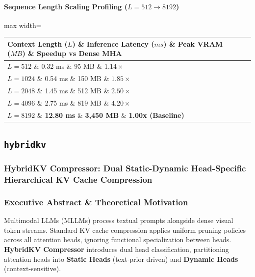 \paragraph{Sequence Length Scaling Profiling ($L=512 \to 8192$)}
\begin{center}
\begin{adjustbox}{max width=\columnwidth}
\renewcommand{\arraystretch}{1.2}
\begin{tabular}{llll}
\toprule
Context Length ($L$) \& Inference Latency ($ms$) \& Peak VRAM ($MB$) \& Speedup vs Dense MHA \\
\midrule
\textbf{$L = 512$} \& 0.32 ms \& 95 MB \& $1.14\times$ \\
\textbf{$L = 1024$} \& 0.54 ms \& 150 MB \& $1.85\times$ \\
\textbf{$L = 2048$} \& 1.45 ms \& 512 MB \& $2.50\times$ \\
\textbf{$L = 4096$} \& 2.75 ms \& 819 MB \& $4.20\times$ \\
\textbf{$L = 8192$} \& \textbf{12.80 ms} \& \textbf{3,450 MB} \& \textbf{1.00x (Baseline)} \\


\bottomrule
\end{tabular}
\end{adjustbox}
\end{center}

\subsection{\texttt{hybridkv}}
\subsubsection*{HybridKV Compressor: Dual Static-Dynamic Head-Specific Hierarchical KV Cache Compression}

\subsubsection*{Executive Abstract \& Theoretical Motivation}

Multimodal LLMs (MLLMs) process textual prompts alongside dense visual token streams. Standard KV cache compression applies uniform pruning policies across all attention heads, ignoring functional specialization between heads. \textbf{HybridKV Compressor} introduces dual head classification, partitioning attention heads into \textbf{Static Heads} (text-prior driven) and \textbf{Dynamic Heads} (context-sensitive).

